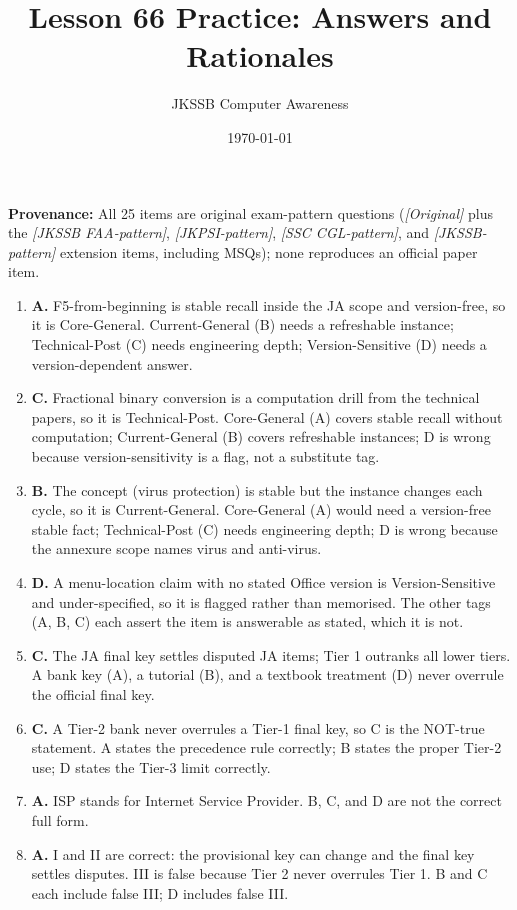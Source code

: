 \documentclass[11pt]{article}
\title{Lesson 66 Practice: Answers and Rationales}
\author{JKSSB Computer Awareness}
\date{\today}
\begin{document}
\maketitle
\noindent\textbf{Provenance:} All 25 items are original exam-pattern questions (\textit{[Original]} plus the \textit{[JKSSB FAA-pattern]}, \textit{[JKPSI-pattern]}, \textit{[SSC CGL-pattern]}, and \textit{[JKSSB-pattern]} extension items, including MSQs); none reproduces an official paper item.
\begin{enumerate}[label=\textbf{Q\arabic*.}, leftmargin=*]
\item \textbf{A.} F5-from-beginning is stable recall inside the JA scope and version-free, so it is Core-General. Current-General (B) needs a refreshable instance; Technical-Post (C) needs engineering depth; Version-Sensitive (D) needs a version-dependent answer.
\item \textbf{C.} Fractional binary conversion is a computation drill from the technical papers, so it is Technical-Post. Core-General (A) covers stable recall without computation; Current-General (B) covers refreshable instances; D is wrong because version-sensitivity is a flag, not a substitute tag.
\item \textbf{B.} The concept (virus protection) is stable but the instance changes each cycle, so it is Current-General. Core-General (A) would need a version-free stable fact; Technical-Post (C) needs engineering depth; D is wrong because the annexure scope names virus and anti-virus.
\item \textbf{D.} A menu-location claim with no stated Office version is Version-Sensitive and under-specified, so it is flagged rather than memorised. The other tags (A, B, C) each assert the item is answerable as stated, which it is not.
\item \textbf{C.} The JA final key settles disputed JA items; Tier 1 outranks all lower tiers. A bank key (A), a tutorial (B), and a textbook treatment (D) never overrule the official final key.
\item \textbf{C.} A Tier-2 bank never overrules a Tier-1 final key, so C is the NOT-true statement. A states the precedence rule correctly; B states the proper Tier-2 use; D states the Tier-3 limit correctly.
\item \textbf{A.} ISP stands for Internet Service Provider. B, C, and D are not the correct full form.
\item \textbf{A.} I and II are correct: the provisional key can change and the final key settles disputes. III is false because Tier 2 never overrules Tier 1. B and C each include false III; D includes false III.

\end{enumerate}
\end{document}
